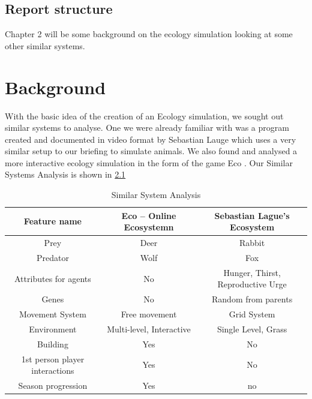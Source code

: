 \documentclass[a4paper, oneside, 11pt]{report}
\begin{document}
\section{Report structure}

	Chapter 2 will be some background on the ecology simulation looking at some other similar systems.

\chapter{Background}

With the basic idea of the creation of an Ecology simulation, we sought out similar systems to analyse.
One we were already familiar with was a program created and documented in video format by Sebastian Lauge \cite{SebastianLague} which uses a very similar setup to our briefing to simulate animals.
We also found and analysed a more interactive ecology simulation in the form of the game Eco \cite{EcoGame}.
Our Similar Systems Analysis is shown in \ref{table:nonlin}

\begin{table}[ht]
	\caption{Similar System Analysis} %
	\centering %
	\begin{tabular}{c c c} %
		\hline\hline %
		Feature name & Eco – Online Ecosystemn  & Sebastian Lague’s Ecosystem \\ [0.5ex] %
		\hline %
		Prey  & Deer  & Rabbit \\ %
		Predator  & Wolf  & Fox \\
		Attributes for agents  & No  & Hunger, Thirst, Reproductive Urge \\
		Genes  & No & Random from parents \\ 
		Movement System   & Free movement & Grid System \\ 
		Environment   & Multi-level, Interactive  & Single Level, Grass \\ 
		Building   & Yes & No \\
		1st person player interactions   & Yes & No\\
		Season progression   & Yes & no \\ [1ex] %
		\hline %
	\end{tabular}
	\label{table:nonlin} %
\end{table}
\end{document}
